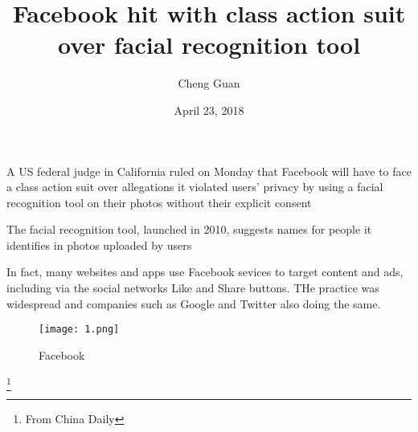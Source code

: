 \documentclass[UTF8]{article}
\author{Cheng Guan}
\date{April 23, 2018}
\title{Facebook hit with class action suit over facial recognition tool}
\begin{document}
\maketitle
    A US federal judge in California ruled on Monday that Facebook
  will have to face a class action suit over allegations it violated users' privacy
  by using a facial recognition tool on their photos without their explicit consent

    The facial recognition tool, launched in 2010,
  suggests names for people it identifies in photos uploaded by users

   In fact, many websites and apps use Facebook sevices
  to target content and ads, including via the social networks Like and Share
  buttons. THe practice was widespread and companies such as Google
  and Twitter also doing the same.
  \begin{figure}[ht]
       \centering
       \texttt{[image: 1.png]}
       \caption{Facebook}
       \label{fig1}
  \end{figure}
  \footnote{\centering From China Daily}
\end{document}
